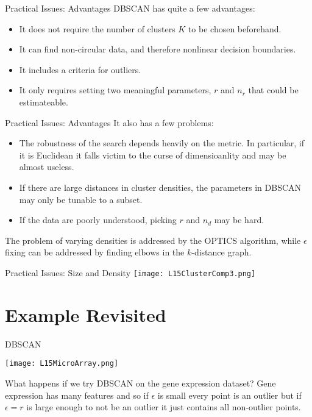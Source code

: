 \documentclass[10pt, table, dvipsnames,xcdraw,handout]{beamer}
\begin{document}
\begin{frame}[fragile]{Practical Issues: Advantages}
DBSCAN has quite a few advantages:

\begin{itemize}
\item[] It does not require the number of clusters $K$ to be chosen beforehand.\pause
\item[] It can find non-circular data, and therefore nonlinear decision boundaries. \pause
\item[] It includes a criteria for outliers. \pause 
\item[] It only requires setting two meaningful parameters, $r$ and $n_r$ that could be estimateable. 
\end{itemize}
\end{frame}


\begin{frame}[fragile]{Practical Issues: Advantages}
It also has a few problems:

\begin{itemize}
\item[] The robustness of the search depends heavily on the metric. In particular, if it is Euclidean it falls victim to the curse of dimensioanlity and may be almost useless. \pause
\item[] If there are large distances in cluster densities, the parameters in DBSCAN may only be tunable to a subset. \pause
\item[] If the data are poorly understood, picking $r$ and $n_d$ may be hard. \pause
\end{itemize}
The problem of varying densities is addressed by the OPTICS algorithm, while $\epsilon$ fixing can be addressed by finding elbows in the $k$-distance graph. 
\end{frame}


\begin{frame}[fragile]{Practical Issues: Size and Density}
	\centering \texttt{[image: L15ClusterComp3.png]} 
\end{frame}


\section{Example Revisited}

\begin{frame}[fragile]{DBSCAN}
  \begin{minipage}[t][0.5\textheight][t]{\textwidth}
	\centering \texttt{[image: L15MicroArray.png]} 
  \end{minipage}
  \vfill
\begin{minipage}[t][0.5\textheight][t]{\textwidth}
What happens if we try DBSCAN on the gene expression dataset? Gene expression has many features and so if $\epsilon$ is small every point is an outlier but if $\epsilon = r$ is large enough to not be an outlier it just contains all non-outlier points. 
\end{minipage}
\end{frame}
\end{document}

